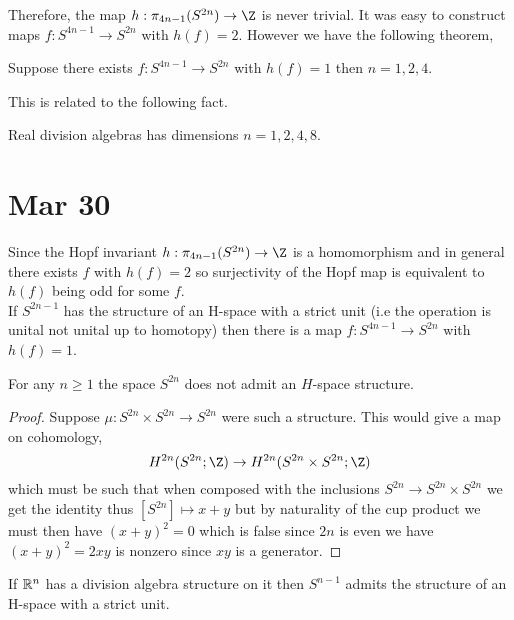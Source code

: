 \documentclass[12pt]{extarticle}
\begin{document}
\begin{rmk}
Therefore, the map $h : \pi_{4n-1}(S^{2n}) \to \Z$ is never trivial. It was easy to construct maps $f : S^{4n - 1} \to S^{2n}$ with $h(f) = 2$. However we have the following theorem,
\end{rmk}

\begin{theorem}[Adams]
Suppose there exists $f : S^{4n - 1} \to S^{2n}$ with $h(f) = 1$ then $n = 1, 2, 4$. 
\end{theorem}

\begin{rmk}
This is related to the following fact.
\end{rmk}

\begin{theorem}
Real division algebras has dimensions $n = 1,2,4,8$. 
\end{theorem}

\section{Mar 30}

Since the Hopf invariant $h : \pi_{4n - 1}(S^{2n}) \to \Z$ is a homomorphism and in general there exists $f$ with $h(f) = 2$ so surjectivity of the Hopf map is equivalent to $h(f)$ being odd for some $f$. 
\bigskip\\
If $S^{2n-1}$ has the structure of an H-space with a strict unit (i.e the operation is unital not unital up to homotopy) then there is a map $f : S^{4n - 1} \to S^{2n}$ with $h(f) = 1$. 

\begin{prop}
For any $n \ge 1$ the space $S^{2n}$ does not admit an $H$-space structure.
\end{prop}

\begin{proof}
Suppose $\mu : S^{2n} \times S^{2n} \to S^{2n}$ were such a structure. This would give a map on cohomology,
\[ H^{2n}(S^{2n};\Z) \to H^{2n}(S^{2n} \times S^{2n}; \Z) \]
which must be such that when composed with the inclusions $S^{2n} \to S^{2n} \times S^{2n}$ we get the identity thus $[S^{2n}] \mapsto x + y$ but by naturality of the cup product we must then have $(x+y)^2 = 0$ which is false since $2n$ is even we have $(x+y)^2 = 2 xy$ is nonzero since $xy$ is a generator.
\end{proof}

\begin{theorem}
If $\mathbb{R}^n$ has a division algebra structure on it then $S^{n-1}$ admits the structure of an H-space with a strict unit.
\end{theorem}
\end{document}
